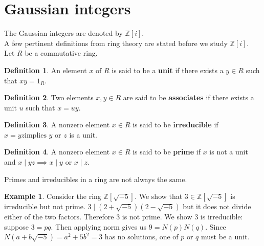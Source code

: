 \documentclass[11pt]{report}
\theoremstyle{plain}
\theoremstyle{definition}
\newtheorem{defn}{Definition}
\newtheorem{exmp}{Example} %
\begin{document}
\section{Gaussian integers}
The Gaussian integers are denoted by $ \mathbb{Z}[i]. $\\
A few pertinent definitions from ring theory are stated before we study $ \mathbb{Z}[i]. $\\
Let $ R $ be a commutative ring.
\begin{defn}
		 An element $ x \text{ of } R  $ is said to be a \textbf{unit}  if there exists a $ y \in R $ such that $ xy = 1_R. $
\end{defn}
\begin{defn}
		Two elements $ x , y \in R $ are said to be \textbf{associates} if there exists a unit $ u $ such that $ x = uy $. 
\end{defn}

\begin{defn}
	A nonzero element $ x \in R $ is said to be \textbf{irreducible} if $ x = yz \text{implies }y \text { or } z $ is a unit.
\end{defn}
\begin{defn}
		A nonzero element $ x \in R $ is said to be \textbf{prime} if $ x $ is not a unit and $ x \mid yz \implies x\mid y \text { or } x \mid z $.
\end{defn}
	Primes and irreducibles in a ring are not always the same. 

	\begin{exmp}
	Consider the ring $ \mathbb{Z}[\sqrt{-5}]$. We show that $3  \in \mathbb{Z}[\sqrt{-5}] $ is irreducible but not prime. $ 3\mid(2+\sqrt{-5})(2-\sqrt{-5}) $ but it does not divide either of the two factors. Therefore 3 is not prime. We show $ 3 $ is irreducible: suppose $ 3 = pq. $ Then applying norm gives us $ 9 = N(p)N(q). $ Since $ N(a+b\sqrt{-5}) = a^2 + 5b^2 = 3$ has no solutions, one of $ p $ or $ q $ must be a unit.

	\end{exmp}
\end{document}
